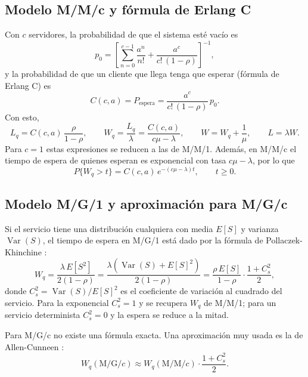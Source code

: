 \documentclass[11pt,letterpaper]{article}
\begin{document}
\subsection{Modelo M/M/c y fórmula de Erlang C}
Con $c$ servidores, la probabilidad de que el sistema esté vacío es
\begin{equation}
  p_0 = \left[\sum_{n=0}^{c-1} \frac{a^n}{n!} + \frac{a^c}{c!\,(1-\rho)}\right]^{-1},
\end{equation}
y la probabilidad de que un cliente que llega tenga que esperar (fórmula de Erlang C) es
\begin{equation}
  C(c,a) = P_{\text{espera}} = \frac{a^c}{c!\,(1-\rho)}\, p_0 .
\end{equation}
Con esto,
\begin{equation}
  L_q = C(c,a)\,\frac{\rho}{1-\rho}, \qquad
  W_q = \frac{L_q}{\lambda} = \frac{C(c,a)}{c\mu - \lambda}, \qquad
  W = W_q + \frac{1}{\mu}, \qquad L = \lambda W .
  \label{eq:mmc}
\end{equation}
Para $c=1$ estas expresiones se reducen a las de M/M/1. Además, en M/M/c el tiempo de
espera de quienes esperan es exponencial con tasa $c\mu-\lambda$, por lo que
\begin{equation}
  P\{W_q > t\} = C(c,a)\, e^{-(c\mu - \lambda)t}, \qquad t \ge 0.
  \label{eq:colawq}
\end{equation}

\subsection{Modelo M/G/1 y aproximación para M/G/c}
Si el servicio tiene una distribución cualquiera con media $E[S]$ y varianza
$\operatorname{Var}(S)$, el tiempo de espera en M/G/1 está dado por la fórmula de
Pollaczek-Khinchine \cite{gross}:
\begin{equation}
  W_q = \frac{\lambda\, E[S^2]}{2(1-\rho)}
      = \frac{\lambda\left(\operatorname{Var}(S) + E[S]^2\right)}{2(1-\rho)}
      = \frac{\rho\,E[S]}{1-\rho}\cdot\frac{1 + C_s^2}{2},
  \label{eq:pk}
\end{equation}
donde $C_s^2 = \operatorname{Var}(S)/E[S]^2$ es el coeficiente de variación al cuadrado del
servicio. Para la exponencial $C_s^2=1$ y se recupera $W_q$ de M/M/1; para un servicio
determinista $C_s^2 = 0$ y la espera se reduce a la mitad.

Para M/G/c no existe una fórmula exacta. Una aproximación muy usada es la de
Allen-Cunneen \cite{allen}:
\begin{equation}
  W_q(\text{M/G/}c) \approx W_q(\text{M/M/}c)\cdot\frac{1 + C_s^2}{2}.
  \label{eq:ac}
\end{equation}
\end{document}

